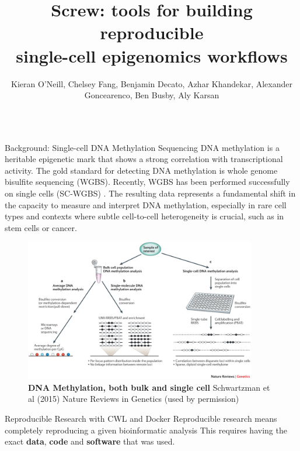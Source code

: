 \documentclass{beamer}
\title{Screw: tools for building reproducible \\ single-cell epigenomics workflows}
\author{Kieran O'Neill, Chelsey Fang, Benjamin Decato, Azhar Khandekar, Alexander Goncearenco, Ben Busby, Aly Karsan}
\institute{Genome Sciences Centre, BC Cancer Agency, Vancouver, BC, Canada}
\begin{document}
\begin{frame}
\begin{columns}[t]



\begin{column}{.32\textwidth}


\begin{block}{Background: Single-cell DNA Methylation Sequencing}
DNA methylation is a heritable epigenetic mark that shows a strong correlation with transcriptional activity. 
The gold standard for detecting DNA methylation is whole genome bisulfite sequencing (WGBS). 
Recently, WGBS has been performed successfully on single cells (SC-WGBS) \cite{Schwartzman2015}.
The resulting data represents a fundamental shift in the capacity to measure and interpret DNA methylation, especially in rare cell types and contexts where subtle cell-to-cell heterogeneity is crucial, such as in stem cells or cancer. 

\begin{figure}
\begin{center}
\includegraphics[width=0.9\textwidth]{figures/nrg3980-f1.jpg}
\end{center}
\caption[]{\textbf{DNA Methylation, both bulk and single cell}
Schwartzman et al (2015) Nature Reviews in Genetics (used by permission) }
\end{figure}

\end{block}


\begin{block}{Reproducible Research with CWL and Docker}
Reproducible research means completely reproducing a given bioinformatic analysis
This requires having the exact \textbf{data}, \textbf{code} and \textbf{software} that was used.


\end{block}
\end{column}
\end{columns}
\end{frame}
\end{document}
